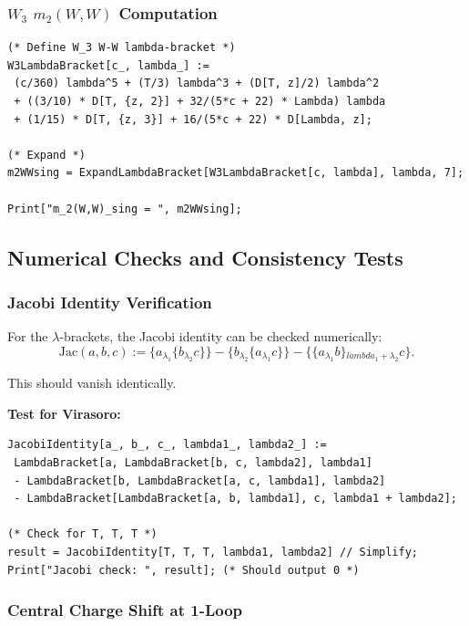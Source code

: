 \subsubsection{$W_3$ $m_2(W,W)$ Computation}

\begin{verbatim}
(* Define W_3 W-W lambda-bracket *)
W3LambdaBracket[c_, lambda_] :=
 (c/360) lambda^5 + (T/3) lambda^3 + (D[T, z]/2) lambda^2
 + ((3/10) * D[T, {z, 2}] + 32/(5*c + 22) * Lambda) lambda
 + (1/15) * D[T, {z, 3}] + 16/(5*c + 22) * D[Lambda, z];

(* Expand *)
m2WWsing = ExpandLambdaBracket[W3LambdaBracket[c, lambda], lambda, 7];

Print["m_2(W,W)_sing = ", m2WWsing];
\end{verbatim}

\subsection{Numerical Checks and Consistency Tests}

\subsubsection{Jacobi Identity Verification}

For the $\lambda$-brackets, the Jacobi identity can be checked numerically:
\begin{equation}
\text{Jac}(a,b,c) := \{a {}_{\lambda_1} \{b {}_{\lambda_2} c\}\} - \{b {}_{\lambda_2} \{a {}_{\lambda_1} c\}\} - \{\{a {}_{\lambda_1} b\} {}_{lambda_1 + \lambda_2} c\}.
\end{equation}

This should vanish identically.

\textbf{Test for Virasoro:}
\begin{verbatim}
JacobiIdentity[a_, b_, c_, lambda1_, lambda2_] :=
 LambdaBracket[a, LambdaBracket[b, c, lambda2], lambda1]
 - LambdaBracket[b, LambdaBracket[a, c, lambda1], lambda2]
 - LambdaBracket[LambdaBracket[a, b, lambda1], c, lambda1 + lambda2];

(* Check for T, T, T *)
result = JacobiIdentity[T, T, T, lambda1, lambda2] // Simplify;
Print["Jacobi check: ", result]; (* Should output 0 *)
\end{verbatim}

\subsubsection{Central Charge Shift at 1-Loop}

